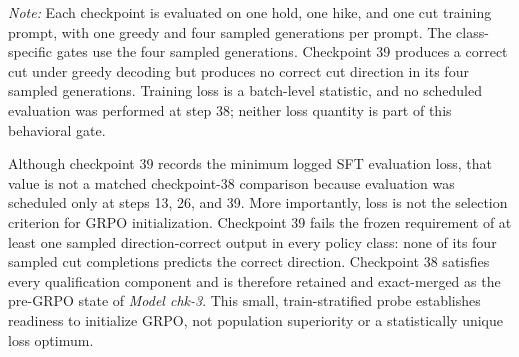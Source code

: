 \begin{table}[htbp]
\begin{minipage}{0.97\textwidth}
        \footnotesize
        \textit{Note:} Each checkpoint is evaluated on one hold, one hike, and
        one cut training prompt, with one greedy and four sampled generations
        per prompt. The class-specific gates use the four sampled generations.
        Checkpoint 39 produces a correct cut under greedy decoding but produces
        no correct cut direction in its four sampled generations. Training loss
        is a batch-level statistic, and no scheduled evaluation was performed at
        step 38; neither loss quantity is part of this behavioral gate.
    \end{minipage}
    \caption{Matched SFT qualification comparison between checkpoints 38 and
    39 for \textit{Model chk-3}. Checkpoint 39 is the terminal SFT state but
    fails the frozen sampled cut-direction coverage requirement.}
    \label{tab:app:chk3_sft_cp38_cp39_selection}
\end{table}

Although checkpoint 39 records the minimum logged SFT evaluation loss, that
value is not a matched checkpoint-38 comparison because evaluation was
scheduled only at steps 13, 26, and 39. More importantly, loss is not the
selection criterion for GRPO initialization. Checkpoint 39 fails the frozen
requirement of at least one sampled direction-correct output in every policy
class: none of its four sampled cut completions predicts the correct direction.
Checkpoint 38 satisfies every qualification component and is therefore retained
and exact-merged as the pre-GRPO state of \textit{Model chk-3}. This small,
train-stratified probe establishes readiness to initialize GRPO, not population
superiority or a statistically unique loss optimum.

